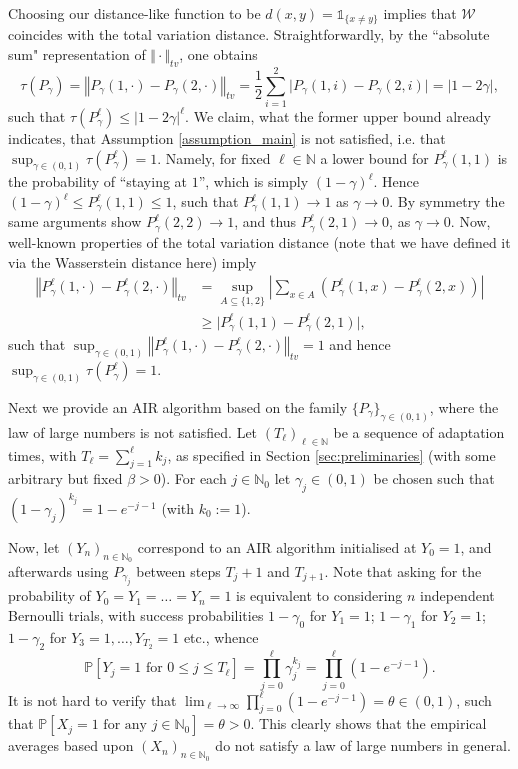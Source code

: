 \documentclass[12pt]{article}
\theoremstyle{definition}
\newcommand{\norm}[1]{\left\Vert #1 \right\Vert}
\newcommand{\N}{\mathbb{N}}
\begin{document}
\begin{appendix}
	Choosing our distance-like function to be $d(x,y) = \mathds{1}_{\{x \neq y\}}$ implies that $\mathcal{W}$ coincides with the total variation distance.
	Straightforwardly, by the ``absolute sum" representation of $\Vert \cdot \Vert_{tv}$, one obtains
	\[
	\tau(P_\gamma) = \norm{P_\gamma(1, \cdot ) - P_\gamma(2, \cdot )}_{tv} = \frac{1}{2}\sum_{i=1}^2 
	\vert P_\gamma(1, i) - P_\gamma(2, i )\vert 
	= \vert 1-2\gamma\vert,
	\]
	such that $\tau(P^\ell_\gamma) \leq \vert 1-2\gamma\vert^\ell$. 
	We claim, what the former upper bound already indicates, that Assumption \ref{assumption_main} is not satisfied, i.e. that $\sup_{\gamma\in(0,1)}
	\tau(P^\ell_\gamma)=1$.
	Namely, for fixed $\ell \in \N$ a lower bound for $P_\gamma^\ell (1, 1)$ is the probability of ``staying at $1$'', which is simply $(1-\gamma)^\ell$. Hence $(1-\gamma)^\ell \leq P_\gamma^\ell (1, 1) \leq 1$, such that $P_\gamma^\ell (1,1) \to 1$ as $\gamma \to 0$.
	By symmetry the same arguments show $P_\gamma^\ell (2, 2) \to 1$, and thus $P_\gamma^\ell (2, 1) \to 0$, as $\gamma \to 0$.
	Now, well-known properties of the total variation distance (note that we have defined it via the Wasserstein distance here) imply 
	\begin{align*}
		\norm{P_\gamma^\ell(1, \cdot ) - P_\gamma^\ell(2, \cdot )}_{tv} & =  \sup_{A \subseteq \{1,2\}} \left\vert \sum_{x\in A}  (P_\gamma^\ell(1, x ) - P_\gamma^\ell(2, x ) )\right\vert \\
		& \geq \vert P_\gamma^\ell(1, 1 ) - P_\gamma^\ell(2, 1 ) \vert,
	\end{align*}
	such that $\sup_{\gamma \in (0,1)}\norm{P_\gamma^\ell(1, \cdot ) - P_\gamma^\ell(2, \cdot )}_{tv} = 1$ and hence $\sup_{\gamma \in (0,1)} \tau(P_\gamma^\ell) = 1$. 
	
	
	Next we provide an AIR algorithm based on the family $\{P_\gamma\}_{\gamma \in (0,1)}$, where the law of large numbers is not satisfied. 
	Let $(T_\ell)_{\ell \in \N}$ be a sequence of adaptation times, with $T_\ell = \sum_{j=1}^\ell k_j$, as specified in Section \ref{sec:preliminaries} (with some arbitrary but fixed $\beta >0$).
	For each $j\in \N_0$ let $\gamma_j  \in (0,1)$ be chosen such that $(1-\gamma_j)^{k_j} =1-e^{-j-1}$ (with $k_0 :=1$).
	
	Now, let $(Y_n)_{n \in \N_0}$ correspond to an AIR algorithm initialised at $Y_0 = 1$, and afterwards using $P_{\gamma_j}$ between steps $T_j +1$ and $T_{j+1}$. 
	Note that asking for the probability of $Y_0=Y_1= \dots = Y_n = 1$ is equivalent to considering $n$ independent Bernoulli trials, with success probabilities $1-\gamma_0$ for $Y_1=1$; $1-\gamma_1$ for $Y_2=1$; $1-\gamma_2$ for $Y_3=1, \dots , Y_{T_2}=1$ etc., whence
	\[
	\mathbb{P}\left[ Y_j = 1 \text{ for }0 \leq j \leq T_\ell  \right] = \prod_{j=0}^\ell \gamma_j^{k_j} = \prod_{j=0}^\ell (1-e^{-j-1}). 
	\]
	It is not hard to verify that $\lim_{\ell\to \infty}\prod_{j=0}^\ell (1-e^{-j-1}) = \theta \in (0,1)$, such that $\mathbb{P}[X_j =1 \text{ for any }j \in \N_0] =\theta >0$. This clearly shows that the empirical averages based upon $(X_n)_{n \in \N_0}$ do not satisfy a law of large numbers in general. 
\end{appendix}
\end{document}
